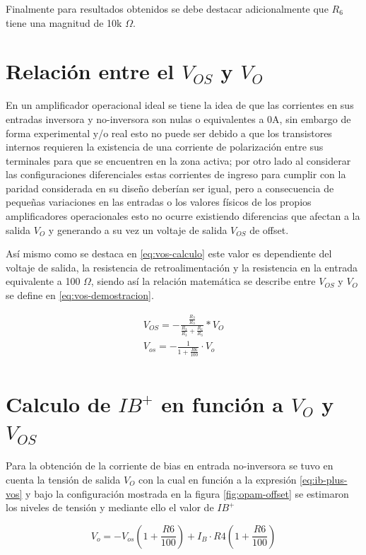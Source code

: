 Finalmente para resultados obtenidos se debe destacar adicionalmente que $R_6$ tiene una magnitud de 10k $\Omega$.

\section{ Relación entre el $V_{OS}$ y $V_O$}

En un amplificador operacional ideal se tiene la idea de que las corrientes en sus entradas inversora y no-inversora son nulas o equivalentes a 0A, sin embargo de forma experimental y/o real esto no puede ser debido a que los transistores internos requieren la existencia de una corriente de polarización entre sus terminales para que se encuentren en la zona activa; por otro lado al considerar las configuraciones diferenciales estas corrientes de ingreso para cumplir con la paridad considerada en su diseño deberían ser igual, pero a consecuencia de pequeñas variaciones en las entradas o los valores físicos de los propios amplificadores operacionales esto no ocurre existiendo diferencias que afectan a la salida $V_O$ y generando a su vez un voltaje de salida $V_{OS}$ de offset.

Así mismo como se destaca en \ref{eq:vos-calculo} este valor es dependiente del voltaje de salida, la resistencia de retroalimentación y la resistencia en la entrada equivalente a 100 $\Omega$, siendo así la relación matemática se describe entre $V_{OS}$ y $V_{O}$ se define en \ref{eq:vos-demostracion}.

\begin{align}
	V_{OS} = -\frac{ \frac{R_3}{R_3} }{ \frac{R_3}{R_3} + \frac{R_6}{R_3}}*V_O \\
	V_{os} = -\frac{1}{1 + \tfrac{R6}{100}} \cdot V_o \\
	\label{eq:vos-demostracion}
\end{align}

\section{Calculo de $IB^{+}$ en función a $V_O$ y $V_{OS}$}

Para la obtención de la corriente de bias en entrada no-inversora se tuvo en cuenta la tensión de salida $V_O$ con la cual en función a la expresión \ref{eq:ib-plus-vos} y bajo la configuración mostrada en la figura \ref{fig:opam-offset} se estimaron los niveles de tensión y mediante ello el valor de $IB^+$

\begin{equation}
	V_o = -V_{os}\left(1 + \frac{R6}{100}\right) + I_B \cdot R4 \left(1 + \frac{R6}{100}\right)
	\label{eq:ib-plus-vos}
\end{equation}

